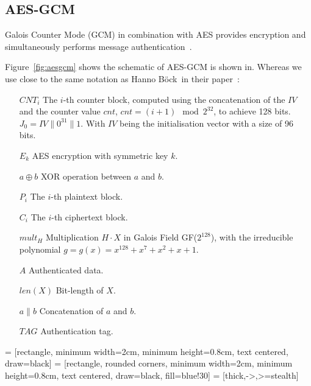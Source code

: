 \subsection{AES-GCM}

Galois Counter Mode (GCM) in combination with AES provides encryption and
simultaneously performs message authentication~\cite{gcm, gcmnist}.

Figure~\ref{fig:aesgcm} shows the schematic of AES-GCM is shown in. Whereas we
use close to the same notation as Hanno Böck~\etal in their
paper~\cite{gcmnonceattack}:

\begin{itemize}
  \item[$CNT_i$] The $i$-th counter block, computed using the concatenation of
the $IV$ and the counter value $cnt$, $cnt = (i+1) \mod{2^{32}}$, to achieve 128
bits. $J_0 = IV \parallel 0 ^{31} \parallel 1$. With $IV$ being the
initialisation vector with a size of 96 bits.
  \item[$E_k$] AES encryption with symmetric key $k$.
  \item[$a \oplus b$] XOR operation between $a$ and $b$.
  \item[$P_i$] The $i$-th plaintext block.
  \item[$C_i$] The $i$-th ciphertext block.
  \item[$mult_H$] Multiplication $H \cdot X$ in Galois Field GF($2^{128}$), 
with the irreducible polynomial $g = g(x) = x^{128} + x^{7} + x^{2} + x + 1$.
  \item[$A$] Authenticated data.
  \item[$len(X)$] Bit-length of $X$.
  \item[$a \parallel b$] Concatenation of $a$ and $b$.
  \item[$TAG$] Authentication tag.
\end{itemize}

 = [rectangle, minimum width=2cm, minimum height=0.8cm, 
text centered, draw=black]
 = [rectangle, rounded corners, minimum width=2cm, 
minimum height=0.8cm, text centered, draw=black, fill=blue!30]
 = [thick,->,>=stealth]

